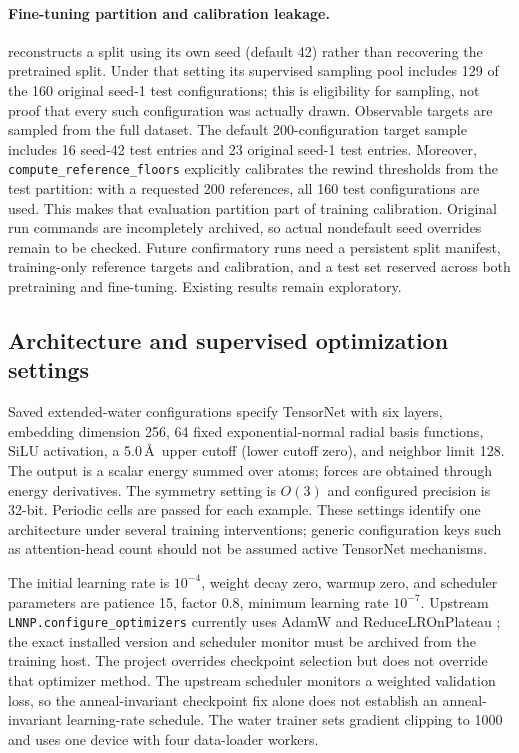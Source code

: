 \documentclass[11pt]{article}
\begin{document}
\paragraph{Fine-tuning partition and calibration leakage.}
 reconstructs a split using its own
seed (default 42) rather than recovering the pretrained split. Under that
setting its supervised sampling pool includes 129 of the 160 original
seed-1 test configurations; this is eligibility for sampling, not proof
that every such configuration was actually drawn. Observable targets are
sampled from the full dataset. The default 200-configuration target sample
includes 16 seed-42 test entries and 23 original seed-1 test entries.
Moreover, \texttt{compute\_reference\_floors} explicitly calibrates the
rewind thresholds from the test partition: with a requested 200 references,
all 160 test configurations are used. This makes that evaluation partition
part of training calibration. Original run commands are incompletely
archived, so actual nondefault seed overrides remain to be checked.
Future confirmatory runs need a persistent split manifest, training-only
reference targets and calibration, and a test set reserved across both
pretraining and fine-tuning. Existing results remain exploratory.

\subsection{Architecture and supervised optimization settings}

Saved extended-water configurations specify TensorNet with six layers,
embedding dimension 256, 64 fixed exponential-normal radial basis
functions, SiLU activation, a 5.0\,\AA\ upper cutoff (lower cutoff zero),
and neighbor limit 128. The output is a scalar energy summed over atoms;
forces are obtained through energy derivatives. The symmetry setting is
$O(3)$ and configured precision is 32-bit. Periodic cells are passed for
each example. These settings identify one architecture under several
training interventions; generic configuration keys such as attention-head
count should not be assumed active TensorNet mechanisms.

The initial learning rate is $10^{-4}$, weight decay zero, warmup zero,
and scheduler parameters are patience 15, factor 0.8, minimum learning rate
$10^{-7}$. Upstream \texttt{LNNP.configure\_optimizers} currently uses
AdamW and ReduceLROnPlateau \citep{torchmdnet-review-source}; the exact installed version and scheduler
monitor must be archived from the training host. The project overrides
checkpoint selection but does not override that optimizer method. The
upstream scheduler monitors a weighted validation loss, so the
anneal-invariant checkpoint fix alone does not establish an
anneal-invariant learning-rate schedule. The water trainer sets gradient
clipping to 1000 and uses one device with four data-loader workers.
\end{document}
